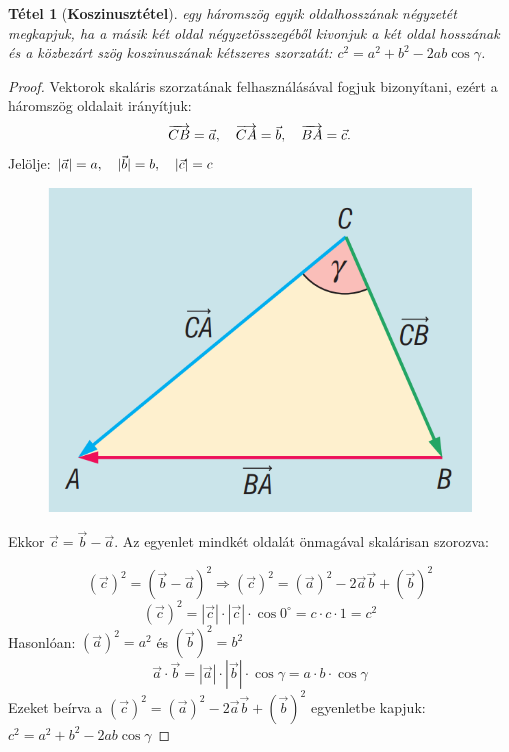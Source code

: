 \documentclass[12pt,a4paper]{article}
\newtheorem{theorem}{Tétel} [section]
\begin{document}
\begin{theorem} [\textbf{Koszinusztétel}]
egy háromszög egyik oldalhosszának négyzetét megkapjuk, ha a másik két oldal négyzetösszegéből kivonjuk a két oldal hosszának és a közbezárt szög koszinuszának kétszeres szorzatát: $c^2=a^2+b^2-2ab\cos \gamma$.
\end{theorem}
\begin{proof}
Vektorok skaláris szorzatának felhasználásával fogjuk bizonyítani, ezért a háromszög oldalait irányítjuk:
$$\overrightarrow{CB}=\vec{a}, \hspace{10px} \overrightarrow{CA}=\vec{b}, \hspace{10px} \overrightarrow{BA}=\vec{c}.$$
Jelölje: $|\vec{a}|=a, \hspace{10px} |\vec{b}| = b, \hspace{10px} |\vec{c}| = c$
\begin{figure}[h]
\centering
\includegraphics[scale=0.3]{geometry/koszinusztetel}
\end{figure}

Ekkor $\vec{c}=\vec{b}-\vec{a}$. Az egyenlet mindkét oldalát önmagával skalárisan szorozva:

$$(\vec{c})^2=(\vec{b}-\vec{a})^2 \Rightarrow (\vec{c})^2 = (\vec{a})^2 - 2\vec{a}\vec{b}+ (\vec{b})^2$$
$$(\vec{c})^2=|\vec{c}|\cdot |\vec{c}| \cdot \cos 0^\circ = c\cdot c \cdot 1= c^2$$
Hasonlóan: $(\vec{a})^2=a^2$ és $(\vec{b})^2=b^2$
$$\vec{a}\cdot \vec{b}=|\vec{a}|\cdot |\vec{b}|\cdot \cos \gamma= a\cdot b\cdot \cos \gamma$$
Ezeket beírva a $(\vec{c})^2 = (\vec{a})^2 - 2\vec{a}\vec{b}+ (\vec{b})^2$ egyenletbe kapjuk: $c^2=a^2+b^2-2ab\cos \gamma$
\end{proof}
\end{document}
